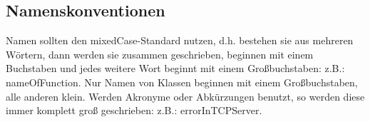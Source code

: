 \subsection{Namenskonventionen}
Namen sollten den \grqq mixedCase\grqq -Standard nutzen, d.h. bestehen sie aus mehreren Wörtern, dann werden sie zusammen geschrieben, beginnen mit einem Buchstaben und jedes weitere Wort beginnt mit einem Großbuchstaben: z.B.: nameOfFunction. Nur Namen von Klassen beginnen mit einem Großbuchstaben, alle anderen klein. Werden Akronyme oder Abkürzungen benutzt, so werden diese immer komplett groß geschrieben: z.B.: errorInTCPServer.
